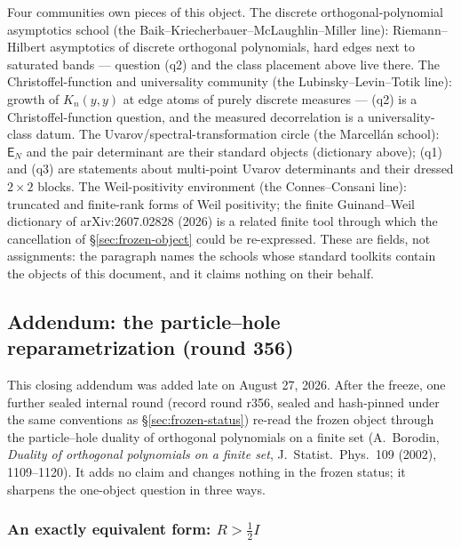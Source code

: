 \documentclass[11pt]{article}
\theoremstyle{remark}
\newcommand{\E}{\mathsf{E}}
\begin{document}
Four communities own pieces of this object.  The discrete
orthogonal-polynomial asymptotics school (the
Baik--Kriecherbauer--McLaughlin--Miller line): Riemann--Hilbert
asymptotics of discrete orthogonal polynomials, hard edges next
to saturated bands --- question (q2) and the class placement
above live there.  The Christoffel-function and universality
community (the Lubinsky--Levin--Totik line): growth of
$K_{n}(y,y)$ at edge atoms of purely discrete measures --- (q2)
is a Christoffel-function question, and the measured
decorrelation is a universality-class datum.  The
Uvarov/spectral-transformation circle (the Marcell\'an school):
$\E_{N}$ and the pair determinant are their standard objects
(dictionary above); (q1) and (q3) are statements about
multi-point Uvarov determinants and their dressed $2\times2$
blocks.  The Weil-positivity environment (the Connes--Consani
line): truncated and finite-rank forms of Weil positivity; the
finite Guinand--Weil dictionary of arXiv:2607.02828 (2026) is a
related finite tool through which the cancellation of
\S\ref{sec:frozen-object} could be re-expressed.  These are
fields, not assignments: the paragraph names the schools whose
standard toolkits contain the objects of this document, and it
claims nothing on their behalf.

\subsection{Addendum: the particle--hole reparametrization
(round 356)}\label{sec:frozen-dualhole}

This closing addendum was added late on August 27, 2026.  After the
freeze, one further sealed internal round (record round r356, sealed
and hash-pinned under the same conventions as
\S\ref{sec:frozen-status}) re-read the frozen object through the
particle--hole duality of orthogonal polynomials on a finite set
(A.~Borodin, \emph{Duality of orthogonal polynomials on a finite
set}, J.~Statist.\ Phys.\ 109 (2002), 1109--1120).  It adds no claim
and changes nothing in the frozen status; it sharpens the one-object
question in three ways.

\subsubsection*{An exactly equivalent form:
\texorpdfstring{$R>\tfrac12 I$}{R > (1/2) I}}
\end{document}
